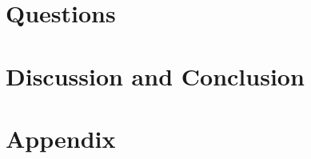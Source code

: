 \documentclass[10pt]{article}
\begin{document}



\section{Questions}

\section{Discussion and Conclusion}


\section*{Appendix}\newpage



\end{document}
